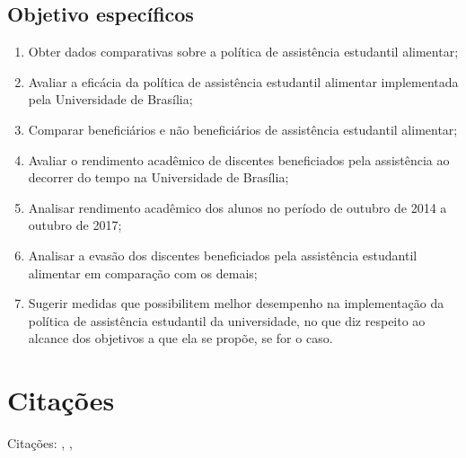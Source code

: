 \subsection{Objetivo específicos}
\begin{enumerate}
	\item Obter dados comparativas sobre a política de assistência estudantil alimentar;
	\item Avaliar a eficácia da política de assistência estudantil alimentar implementada pela Universidade de Brasília;
	\item Comparar beneficiários e não beneficiários de assistência estudantil alimentar;
	\item Avaliar o rendimento acadêmico de discentes beneficiados pela assistência ao decorrer do tempo na Universidade de Brasília; 
	\item Analisar rendimento acadêmico dos alunos no período de outubro de 2014 a outubro de 2017;
	\item Analisar a evasão dos discentes beneficiados pela assistência estudantil alimentar em comparação com os demais;
	\item Sugerir medidas que possibilitem melhor desempenho na implementação da política de assistência estudantil da universidade, no que diz respeito ao alcance dos objetivos a que ela se propõe, se for o caso.
\end{enumerate}%
\section{Citações}%
   Citações: \cite{Beatriz2007ABrasileiro}, \cite{Rita2006AEvasao}, 

